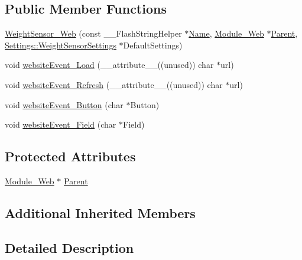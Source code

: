 \subsection*{Public Member Functions}
\begin{DoxyCompactItemize}
\item 
\hyperlink{class_weight_sensor___web_a8528c52192e9e5c4859ce61099dd9c33}{Weight\+Sensor\+\_\+\+Web} (const \+\_\+\+\_\+\+Flash\+String\+Helper $\ast$\hyperlink{class_common_aeea91a726dbe988e515057b32ba0726f}{Name}, \hyperlink{class_module___web}{Module\+\_\+\+Web} $\ast$\hyperlink{class_weight_sensor___web_aa3ac7e1b7e806eec4362085ed0e16f52}{Parent}, \hyperlink{struct_settings_1_1_weight_sensor_settings}{Settings\+::\+Weight\+Sensor\+Settings} $\ast$Default\+Settings)
\item 
void \hyperlink{class_weight_sensor___web_ac0e106b3dbf03e5dd05e35f1f2305eb3}{website\+Event\+\_\+\+Load} (\+\_\+\+\_\+attribute\+\_\+\+\_\+((unused)) char $\ast$url)
\item 
void \hyperlink{class_weight_sensor___web_aa47b67e39e6cbd1b543e482c94160a66}{website\+Event\+\_\+\+Refresh} (\+\_\+\+\_\+attribute\+\_\+\+\_\+((unused)) char $\ast$url)
\item 
void \hyperlink{class_weight_sensor___web_a94a8c1c5cbc9fd4563076e1f9ab18ced}{website\+Event\+\_\+\+Button} (char $\ast$Button)
\item 
void \hyperlink{class_weight_sensor___web_a450714f6d3c278a2f7ee97b10ec503c6}{website\+Event\+\_\+\+Field} (char $\ast$Field)
\end{DoxyCompactItemize}
\subsection*{Protected Attributes}
\begin{DoxyCompactItemize}
\item 
\hyperlink{class_module___web}{Module\+\_\+\+Web} $\ast$ \hyperlink{class_weight_sensor___web_aa3ac7e1b7e806eec4362085ed0e16f52}{Parent}
\end{DoxyCompactItemize}
\subsection*{Additional Inherited Members}


\subsection{Detailed Description}


